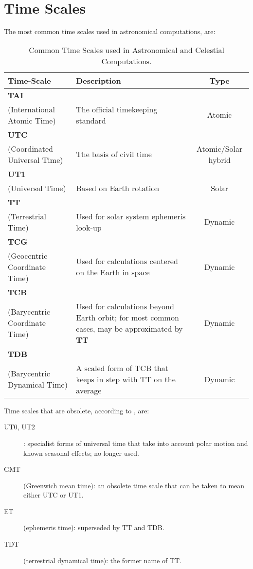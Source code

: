 \section{Time Scales}
The most common time scales used in astronomical computations, are:
\begin{table}
  \centering
\begin{tabularx}{\textwidth}{>{\raggedright\arraybackslash}X >{\raggedright\arraybackslash}X c}
    \bf{Time-Scale} & \bf{Description} & \bf{Type} \\
  \hline
  \textbf{TAI}\\ \scriptsize{(International Atomic Time)} & The official timekeeping standard & Atomic \\
  \textbf{UTC}\\ \scriptsize{(Coordinated Universal Time)} & The basis of civil time & Atomic/Solar hybrid \\
  \textbf{UT1}\\ \scriptsize{(Universal Time)} & Based on Earth rotation & Solar \\
  \textbf{TT}\\ \scriptsize{(Terrestrial Time)} & Used for solar system ephemeris look-up &  Dynamic \\
  \textbf{TCG}\\ \scriptsize{(Geocentric Coordinate Time)} & Used for calculations centered on the Earth in space & Dynamic \\
  \textbf{TCB}\\ \scriptsize{(Barycentric Coordinate Time)} & Used for calculations beyond Earth orbit; for most common cases, may be approximated by \textbf{TT} & Dynamic \\
  \textbf{TDB}\\ \scriptsize{(Barycentric Dynamical Time)} & A scaled form of TCB that keeps in step with TT
on the average & Dynamic \\
\end{tabularx}
\caption{Common Time Scales used in Astronomical and Celestial Computations.}
\end{table}

Time scales that are obsolete, according to \cite{SOFA20210125}, are:
\begin{description}
  \item[UT0, UT2]: specialist forms of universal time that take into account polar motion and
known seasonal effects; no longer used.
  \item[GMT] (Greenwich mean time): an obsolete time scale that can be taken to mean either
UTC or UT1.
  \item[ET] (ephemeris time): superseded by TT and TDB.
  \item[TDT] (terrestrial dynamical time): the former name of TT.
\end{description}

